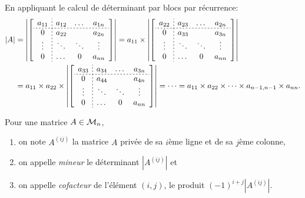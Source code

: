 En appliquant le calcul de déterminant par blocs par récurrence:
\begin{align*}
  |A| 
  & = 
  \left|\left[\begin{array}{c;{2pt/2pt}ccc}
                a_{11} & a_{12} & \dots & a_{1n} \\
                \hdashline[2pt/2pt]
                0 & a_{22} &  & a_{2n} \\
                \vdots  & \ddots & \ddots & \vdots \\
                0 & \dots & 0 & a_{nn} \\
              \end{array}\right]\right| 
  = a_{11} \times 
  \left|\left[\begin{array}{c;{2pt/2pt}ccc}
                a_{22} & a_{23} & \dots & a_{2n} \\
                \hdashline[2pt/2pt]
                0 & a_{33} &  & a_{3n} \\
                \vdots & \ddots & \ddots & \vdots \\
                0 & \dots & 0 & a_{nn} \\
              \end{array}\right]\right| \\
  & = a_{11} \times a_{22} \times 
  \left|\left[\begin{array}{c;{2pt/2pt}ccc}
                a_{33} & a_{34} & \dots & a_{3n} \\
                \hdashline[2pt/2pt]
                0 & a_{44} &  & a_{4n} \\
                \vdots  & \ddots & \ddots & \vdots \\
                0 & \dots & 0 & a_{nn} \\
              \end{array}\right]\right| 
  = \dots = a_{11} \times a_{22} \times \dots \times a_{n-1, n-1} \times a_{nn}.
\end{align*}
\eproof

\begin{definition} \label{def:mineurCofacteur}
  Pour une matrice $A \in \mathcal{M}_n$, 
  \begin{enumerate}[\itemdot]
   \item on note $A^{(ij)}$ la matrice $A$ privée de sa $i$ème ligne et de sa $j$ème colonne,
   \item on appelle {\em mineur} le déterminant $|A^{(ij)}|$ et
   \item on appelle {\em cofacteur} de l'élément $(i, j)$, le produit $(-1)^{i+j} |A^{(ij)}|$.
  \end{enumerate}
\end{definition}

